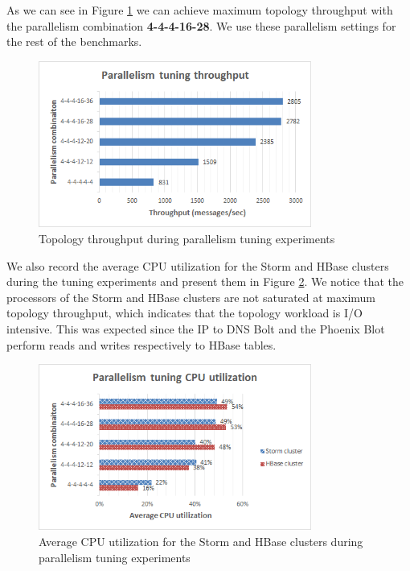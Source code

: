 As we can see in Figure \ref{figure:benchmarks_storm_tuning_throughput} we can achieve maximum topology throughput with the parallelism combination \textbf{4-4-4-16-28}. We use these parallelism settings for the rest of the benchmarks.

\begin{figure}[H]
\centering
\includegraphics[width=0.8\textwidth]{figures/benchmarks_storm_tuning_throughput}
\caption{Topology throughput during parallelism tuning experiments}
\label{figure:benchmarks_storm_tuning_throughput}
\end{figure}

We also record the average CPU utilization for the Storm and HBase clusters during the tuning experiments and present them in Figure \ref{figure:benchmarks_storm_tuning_cpu}. We notice that the processors of the Storm and HBase clusters are not saturated at maximum topology throughput, which indicates that the topology workload is I/O intensive. This was expected since the IP to DNS Bolt and the Phoenix Blot perform reads and writes respectively to HBase tables.

\begin{figure}[H]
\centering
\includegraphics[width=0.8\textwidth]{figures/benchmarks_storm_tuning_cpu}
\caption{Average CPU utilization for the Storm and HBase clusters during parallelism tuning experiments}
\label{figure:benchmarks_storm_tuning_cpu}
\end{figure}

